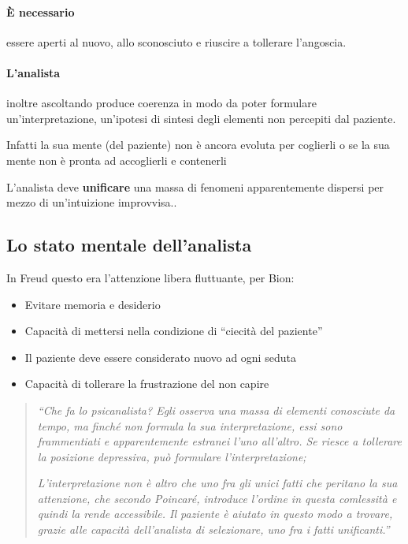 \documentclass[12pt, a4paper]{article}
\begin{document}
\paragraph{\`E necessario} essere aperti al nuovo, allo sconosciuto e riuscire a tollerare l'angoscia.

\paragraph{L'analista} inoltre ascoltando produce coerenza in modo da poter formulare un'interpretazione, un'ipotesi di sintesi degli elementi non percepiti dal paziente.

Infatti la sua mente (del paziente) non \`e ancora evoluta per coglierli o se la sua mente  non \`e pronta ad accoglierli e contenerli

L'analista deve \textbf{unificare} una massa di fenomeni apparentemente dispersi per mezzo di un'intuizione improvvisa..

\subsection{Lo stato mentale dell'analista}

In Freud questo era l'attenzione libera fluttuante, per Bion:

\begin{itemize}
    \item Evitare memoria e desiderio
    \item Capacit\`a di mettersi nella condizione di ``ciecit\`a del paziente''
    \item Il paziente deve essere considerato nuovo ad ogni seduta
    \item Capacit\`a di tollerare la frustrazione del non capire
\end{itemize}

\begin{quotation}
    \emph{``Che fa lo psicanalista? Egli osserva una massa di elementi conosciute da tempo, ma finch\'e non formula la sua interpretazione, essi sono frammentiati e apparentemente estranei l'uno all'altro. Se riesce a tollerare la posizione depressiva, può formulare l'interpretazione;}

    \emph{L'interpretazione non \`e altro che uno fra gli unici fatti che peritano la sua attenzione, che secondo Poincar\'e, introduce l'ordine in questa comlessit\`a e quindi la rende accessibile. Il paziente \`e aiutato in questo modo a trovare, grazie alle capacit\`a dell'analista di selezionare, uno fra i fatti unificanti.''}
\end{quotation}
\end{document}
